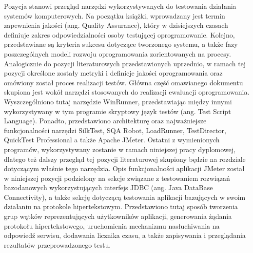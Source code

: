 Pozycja \cite{prasad2004software} stanowi przegląd narzędzi wykorzystywanych do testowania działania systemów komputerowych. Na początku książki, wprowadzany jest termin zapewnienia jakości (ang. Quality Assurance), który w dzisiejszych czasach definiuje zakres odpowiedzialności osoby testującej oprogramowanie. Kolejno, przedstawiane są kryteria sukcesu dotyczące tworzonego systemu, a także fazy poszczególnych modeli rozwoju oprogramowania zorientowanych na procesy. Analogicznie do pozycji literaturowych przedstawionych uprzednio, w ramach tej pozycji określone zostały metryki i definicje jakości oprogramowania oraz omówiony został proces realizacji testów. Główna część omawianego dokumentu skupiona jest wokół narzędzi stosowanych do realizacji ewaluacji oprogramowania. Wyszczególniono tutaj narzędzie WinRunner, przedstawiając między innymi wykorzystywany w tym programie skryptowy język testów (ang. Test Script Language). Ponadto, przedstawiono architekturę oraz najważniejsze funkcjonalności narzędzi SilkTest, SQA Robot, LoadRunner, TestDirector, QuickTest Professional a także Apache JMeter. Ostatni z wymienionych programów, wykorzystywany zostanie w ramach niniejszej pracy dyplomowej, dlatego też dalszy przegląd tej pozycji literaturowej skupiony będzie na rozdziale dotyczącym właśnie tego narzędzia. Opis funkcjonalności aplikacji JMeter został w niniejszej pozycji podzielony na sekcje związane z testowaniem rozwiązań bazodanowych wykorzystujących interfejs JDBC (ang. Java DataBase Connectivity), a także sekcję dotyczącą testowania aplikacji bazujących w swoim działaniu na protokole hipertekstowym. Przedstawiono tutaj sposób tworzenia grup wątków reprezentujących użytkowników aplikacji, generowania żądania protokołu hipertekstowego, uruchomienia mechanizmu nasłuchiwania na odpowiedź serwisu, dodawania licznika czasu, a także zapisywania i przeglądania rezultatów przeprowadzonego testu.

